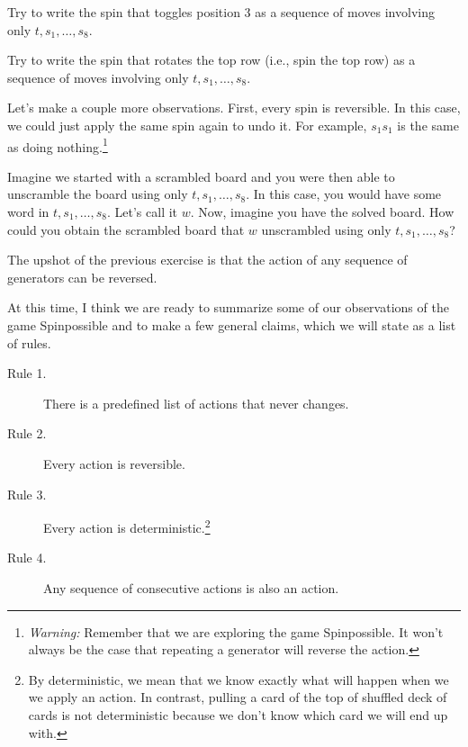 \begin{exercise}
Try to write the spin that toggles position 3 as a sequence of moves involving only \(t, s_1, \ldots, s_8\).
\end{exercise}

\begin{exercise}
Try to write the spin that rotates the top row (i.e., spin the top row) as a sequence of moves involving only \(t, s_1, \ldots, s_8\).
\end{exercise}

Let's make a couple more observations.  First, every spin is reversible.  In this case, we could just apply the same spin again to undo it.  For example, \(s_1s_1\) is the same as doing nothing.\footnote{\emph{Warning:} Remember that we are exploring the game Spinpossible.  It won't always be the case that repeating a generator will reverse the action.}

\begin{exercise}
Imagine we started with a scrambled board and you were then able to unscramble the board using only \(t, s_1, \ldots, s_8\).  In this case, you would have some word in \(t, s_1, \ldots, s_8\). Let's call it \(w\).  Now, imagine you have the solved board.  How could you obtain the scrambled board that \(w\) unscrambled using only \(t, s_1,\ldots, s_8\)?
\end{exercise}

The upshot of the previous exercise is that the action of any sequence of generators can be reversed.

At this time, I think we are ready to summarize some of our observations of the game Spinpossible and to make a few general claims, which we will state as a list of rules.

\begin{description}
\item[Rule 1.] There is a predefined list of actions that never changes.
\item[Rule 2.] Every action is reversible.
\item[Rule 3.] Every action is deterministic.\footnote{By deterministic, we mean that we know exactly what will happen when we we apply an action.  In contrast, pulling a card of the top of shuffled deck of cards is not deterministic because we don't know which card we will end up with.}
\item[Rule 4.] Any sequence of consecutive actions is also an action.
\end{description}

